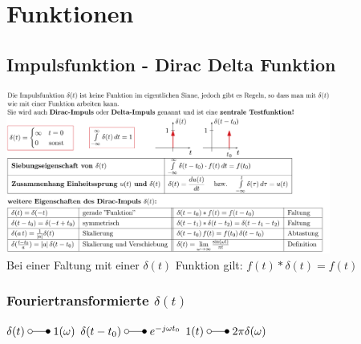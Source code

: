 \section{Funktionen}
	\subsection{Impulsfunktion - Dirac Delta Funktion }
		\includegraphics[width=0.8\textwidth]{./bilder/funktionen/impulsF.png}\\
        
        Bei einer Faltung mit einer $\delta\left(t\right)$ Funktion
        gilt: $f\left(t\right) \ast \delta\left(t\right) = f\left(t\right)$
	
	\subsubsection{Fouriertransformierte $\delta(t)$}
		$\delta(t) \; \laplace \; 1(\omega)$ \qquad
		$\delta(t-t_0) \; \laplace \; e^{-j\omega t_0}$ \qquad
		$1(t) \; \laplace \; 2\pi \delta(\omega)$



